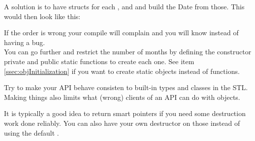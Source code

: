 \documentclass[a4paper, twocolumn]{article}
\newcommand{\code}[1]{\texttt{\color{black}{#1}}}
\begin{document}
A solution is to have structs for each \code{Day}, \code{Month} and \code{Year} and build the Date from those. This would then look like this:

\code{Date d(Day(30), Month(10), Year(1982));}

If the order is wrong your compile will complain and you will know instead of having a bug.\\
You can go further and restrict the number of months by defining the constructor private and public static functions to create each one. See item \ref{ssec:objInitialization} if you want to create static objects instead of functions.

Try to make your API behave consisten to built-in types and classes in the STL. Making things \code{const} also limits what (wrong) clients of an API can do with objects.

It is typically a good idea to return smart pointers if you need some destruction work done reliably. You can also have your own destructor on those instead of using the default \code{delete}.
\end{document}
